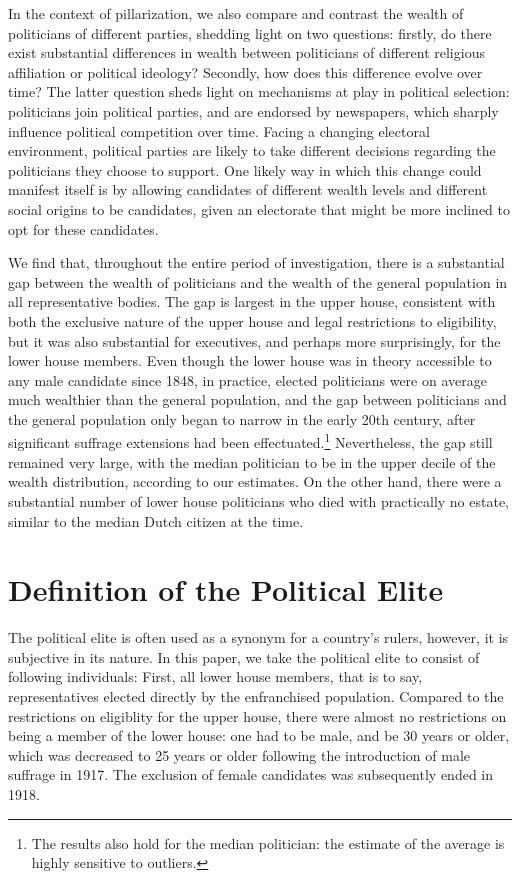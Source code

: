    In the context of pillarization, we also compare and contrast the wealth of politicians of different parties, shedding light on two questions: firstly, do there exist substantial differences in wealth between politicians of different religious affiliation or political ideology? Secondly, how does this difference evolve over time? The latter question sheds light on mechanisms at play in political selection: politicians join political parties, and are endorsed by newspapers, which sharply influence political competition over time. Facing a changing electoral environment, political parties are likely to take different decisions regarding the politicians they choose to support. One likely way in which this change could manifest itself is by allowing candidates of different wealth levels and different social origins to be candidates, given an electorate that might be more inclined to opt for these candidates. 

    We find that, throughout the entire period of investigation, there is a substantial gap between the wealth of politicians and the wealth of the general population in all representative bodies. The gap is largest in the upper house, consistent with both the exclusive nature of the upper house and legal restrictions to eligibility, but it was also substantial for executives, and perhaps more surprisingly, for the lower house members. Even though the lower house was in theory accessible to any male candidate since 1848, in practice, elected politicians were on average much wealthier than the general population, and the gap between politicians and the general population only began to narrow in the early 20th century, after significant suffrage extensions had been effectuated.\footnote{The results also hold for the median politician: the estimate of the average is highly sensitive to outliers.} Nevertheless, the gap still remained very large, with the median politician to be in the upper decile of the wealth distribution, according to our estimates. On the other hand, there were a substantial number of lower house politicians who died with practically no estate, similar to the median Dutch citizen at the time.\autocite{de2020exploring}

\section{Definition of the Political Elite}
    The political elite is often used as a synonym for a country's rulers, however, it is subjective in its nature. In this paper, we take the political elite to consist of following individuals: First, all lower house members, that is to say, representatives elected directly by the enfranchised population. Compared to the restrictions on eligiblity for the upper house, there were almost no restrictions on being a member of the lower house: one had to be male, and be 30 years or older, which was decreased to 25 years or older following the introduction of male suffrage in 1917. The exclusion of female candidates was subsequently ended in 1918. \autocite{van2018tussen} 

